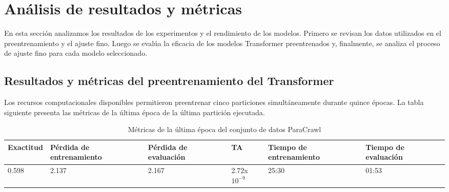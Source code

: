 \section{Análisis de resultados y métricas}
En esta sección analizamos los resultados de los experimentos y el rendimiento de los modelos. Primero se revisan los datos utilizados en el preentrenamiento y el ajuste fino. Luego se evalúa la eficacia de los modelos Transformer preentrenados y, finalmente, se analiza el proceso de ajuste fino para cada modelo seleccionado.

\subsection{Resultados y métricas del preentrenamiento del Transformer}

Los recursos computacionales disponibles permitieron preentrenar cinco particiones simultáneamente durante quince épocas. La tabla siguiente presenta las métricas de la última época de la última partición ejecutada.

\begin{table}[H]
\centering
\begin{tabular}{|l|l|l|l|l|l|}
\hline
Exactitud & Pérdida de entrenamiento & Pérdida de evaluación & TA & Tiempo de entrenamiento & Tiempo de evaluación \\ \hline
0.598 & 2.137 & 2.167 & 2.72x$10^{-9}$ & 25:30 & 01:53 \\ \hline
\end{tabular}
\caption{Métricas de la última época del conjunto de datos ParaCrawl}
\label{table:LastepochParaCrawlDataset}
\end{table}
